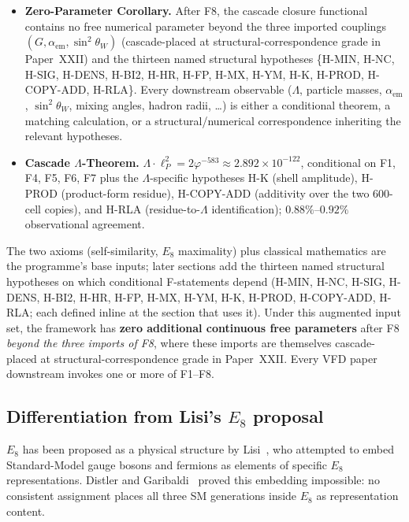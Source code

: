 \documentclass[12pt]{article}
\theoremstyle{definition}
\theoremstyle{remark}
\begin{document}
\begin{itemize}
\item \textbf{Zero-Parameter Corollary.} After F8, the cascade closure functional contains no free numerical parameter beyond the three imported couplings $(G, \alpha_{\mathrm{em}}, \sin^2\theta_W)$ (cascade-placed at structural-correspondence grade in Paper~XXII) and the thirteen named structural hypotheses \{H-MIN, H-NC, H-SIG, H-DENS, H-BI2, H-HR, H-FP, H-MX, H-YM, H-K, H-PROD, H-COPY-ADD, H-RLA\}. Every downstream observable ($\Lambda$, particle masses, $\alpha_{\mathrm{em}}$, $\sin^2 \theta_W$, mixing angles, hadron radii, \ldots) is either a conditional theorem, a matching calculation, or a structural/numerical correspondence inheriting the relevant hypotheses.
\item \textbf{Cascade $\Lambda$-Theorem.} $\Lambda \cdot \ell_P^2 = 2\varphi^{-583} \approx 2.892 \times 10^{-122}$, conditional on F1, F4, F5, F6, F7 plus the $\Lambda$-specific hypotheses H-K (shell amplitude), H-PROD (product-form residue), H-COPY-ADD (additivity over the two 600-cell copies), and H-RLA (residue-to-$\Lambda$ identification); $0.88\%$--$0.92\%$ observational agreement.
\end{itemize}

The two axioms (self-similarity, $E_8$ maximality) plus classical mathematics are the programme's base inputs; later sections add the thirteen named structural hypotheses on which conditional F-statements depend (H-MIN, H-NC, H-SIG, H-DENS, H-BI2, H-HR, H-FP, H-MX, H-YM, H-K, H-PROD, H-COPY-ADD, H-RLA; each defined inline at the section that uses it). Under this augmented input set, the framework has \textbf{zero additional continuous free parameters} after F8 \emph{beyond the three imports of F8}, where these imports are themselves cascade-placed at structural-correspondence grade in Paper~XXII. Every VFD paper downstream invokes one or more of F1--F8.

\subsection{Differentiation from Lisi's $E_8$ proposal}

$E_8$ has been proposed as a physical structure by Lisi~\citep{Lisi2007}, who attempted to embed Standard-Model gauge bosons and fermions as elements of specific $E_8$ representations. Distler and Garibaldi~\citep{DistlerGaribaldi2010} proved this embedding impossible: no consistent assignment places all three SM generations inside $E_8$ as representation content.
\end{document}
